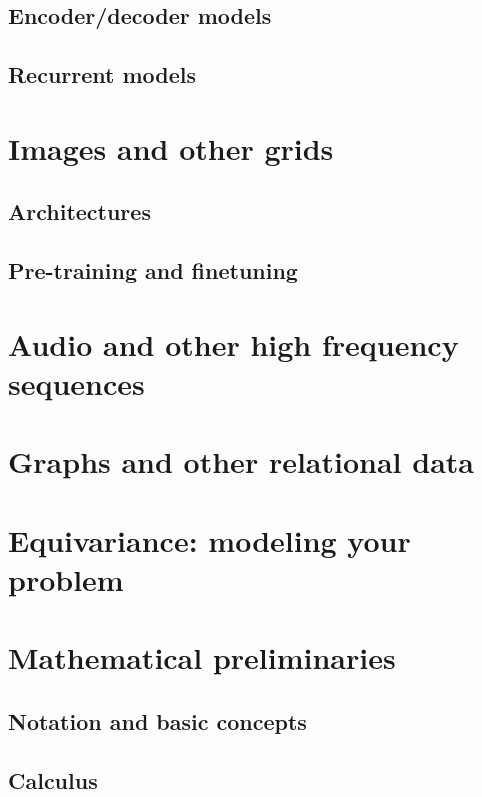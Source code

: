 \documentclass{pca}
\theoremstyle{theorem}
\theoremstyle{definition}
\theoremstyle{proof}
\begin{document}
\section{Encoder/decoder models}

\section{Recurrent models}


\chapter{Images and other grids}

\section{Architectures}

\section{Pre-training and finetuning}

\chapter{Audio and other high frequency sequences}


\chapter{Graphs and other relational data}

\chapter{Equivariance: modeling your problem}

\appendix

\chapter{Mathematical preliminaries}
\label{ch:preliminaries}

\section{Notation and basic concepts}

\section{Calculus}
\end{document}
